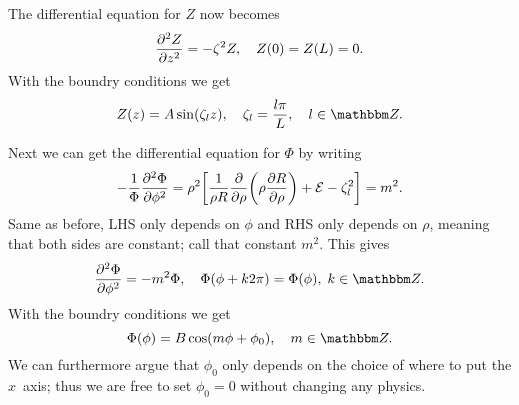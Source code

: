 \documentclass[11pt,letter, swedish, english
]{article}
\begin{document}
The differential equation for $Z$ now becomes
\begin{equation}
\pdv[2]{Z}{z}=-\zeta^2Z\qcomma
Z(0)=Z(L)=0.
\end{equation}
With the boundry conditions we get
\begin{equation}
Z(z)=A\sin(\zeta_l z)\qcomma 
\zeta_l=\frac{l\pi}{L}\qcomma l\in\Z.
\end{equation}

Next we can get the differential equation for $\Phi$ by writing
\begin{equation}
-\frac{1}{\Phi}\pdv[2]{\Phi}{\phi} 
= \rho^2\qty[\frac{1}{\rho R}\pdv{\rho}
\qty(\rho\pdv{R}{\rho})+\mathcal{E}-\zeta_l^2]
=m^2.
\end{equation}
Same as before, LHS only depends on $\phi$ and RHS only depends on
$\rho$, meaning that both sides are constant; call that constant
$m^2$. This gives
\begin{equation}
\pdv[2]{\Phi}{\phi} =-m^2\Phi\qcomma
\Phi(\phi+k2\pi)=\Phi(\phi),\;k\in\Z.
\end{equation}
With the boundry conditions we get
\begin{equation}
\Phi(\phi)=B\cos(m\phi+\phi_0)\qcomma
m\in\Z.
\end{equation}
We can furthermore argue that $\phi_0$ only depends on the choice of
where to put the $x$~axis; thus we are free to set $\phi_0=0$ without
changing any physics.
\end{document}
